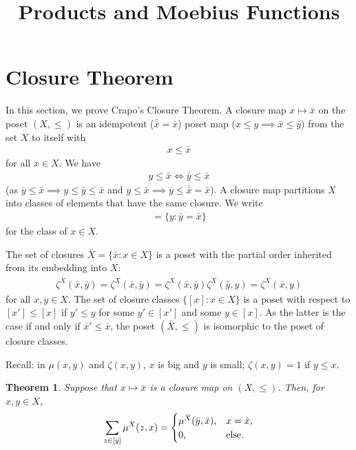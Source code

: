 \documentclass[12pt,a4paper]{amsart}
\title{Products and Moebius Functions}
\newtheorem{theorem}{Theorem}[section]
\begin{document}
\maketitle

\section{Closure Theorem}
\label{sec:closure-theorem}

In this section, we prove Crapo's Closure Theorem.  A closure map  
$x \mapsto \bar{x}$ 
on
the poset $(X, \leq)$ is an idempotent ($\bar{\bar{x}} = \bar{x}$) poset map
($x \leq y \implies \bar{x} \leq \bar{y}$) from the set
$X$ to itself with
\begin{align*}
x \leq \bar{x}
\end{align*}
for all $x \in X$.  We have
\begin{align*}
  y \leq \bar{x} \iff \bar{y} \leq \bar{x}
\end{align*}
(as $\bar{y} \leq \bar{x} \implies y \leq \bar{y} \leq \bar{x}$ and
$y \leq \bar{x} \implies \bar{y} \leq \bar{\bar{x}} = \bar{x}$).
A closure map partitions $X$ into classes of
elements that have the same closure. We write
\begin{align*}
[x] = \{y: \bar{y} = \bar{x}\}
\end{align*}
for the class of $x \in X$.

The set of closures $\bar{X} = \{\bar{x} : x \in X\}$ is a poset with
the partial order inherited from its embedding into $X$:
\begin{align*}
\zeta^{\bar{X}}(\bar{x}, \bar{y}) = \zeta^X(\bar{x}, \bar{y})
= \zeta^X(\bar{x}, \bar{y}) \zeta^X(\bar{y}, y)
= \zeta^X(\bar{x}, y)
\end{align*}
 for all $x, y \in X$.  The set of
closure classes $\{[x] : x \in X\}$ is a poset with respect to
$[x'] \leq [x]$ if $y' \leq y$ for some $y' \in [x']$ and some
$y \in [x]$.  As the latter is the case if and only if
$\bar{x}' \leq \bar{x}$, the poset $(\bar{X}, \leq)$ is isomorphic to
the poset of closure classes.

Recall: in $\mu(x, y)$ and $\zeta(x, y)$, $x$ is big and $y$ is small;
$\zeta(x, y) = 1$ if $y \leq x$.

\begin{theorem}
Suppose that $x \mapsto \bar{x}$ is a closure map on $(X, \leq)$.  Then,
for $x, y \in X$,
\begin{align*}
  \sum_{z \in [y]} \mu^X(z, x) =
  \begin{cases}
    \mu^{\bar{X}}(\bar{y}, \bar{x})\text, & x = \bar{x}\text, \\
0\text, & \text{else.}
  \end{cases}
\end{align*}
\end{theorem}
\end{document}
